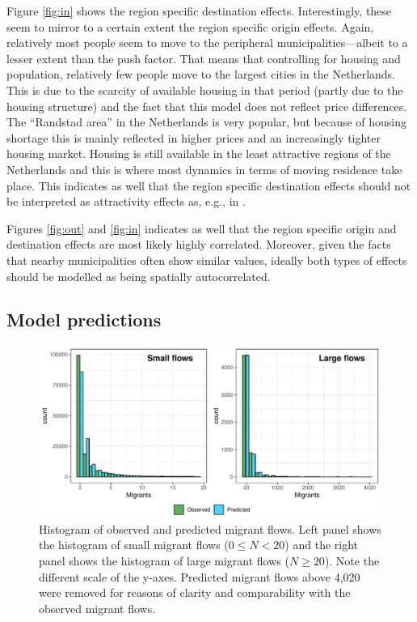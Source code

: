 \documentclass[fleqn,10pt]{SelfArx} %
\begin{document}
{{Figure \ref{fig:in} shows the region specific destination effects. Interestingly, these seem to mirror to a certain extent the region specific origin effects. Again, relatively most people seem to move to the peripheral municipalities---albeit to a lesser extent than the push factor. That means that controlling for housing and population, relatively few people move to the largest cities in the Netherlands. This is due to the scarcity of available housing in that period (partly due to the housing structure) and the fact that this model does not reflect price differences. The ``Randstad area'' in the Netherlands is very popular, but because of housing shortage this is mainly reflected in higher prices and an increasingly tighter housing market. Housing is still available in the least attractive regions of the Netherlands and this is where most dynamics in terms of moving residence take place. This indicates as well that the region specific destination effects should not be interpreted as attractivity effects as, e.g., in \citet{congdon2010random}.

Figures \ref{fig:out} and \ref{fig:in} indicates as well that the region specific origin and destination effects are most likely highly correlated. Moreover, given the facts that nearby municipalities often show similar values, ideally both types of effects should be modelled as being spatially autocorrelated. 

\subsection{Model predictions}

\begin{figure}[t!]\centering 
  \includegraphics[width=0.8\linewidth]{../fig/hist_fit.pdf}
  \caption{Histogram of observed and predicted migrant flows. Left
    panel shows the histogram of small migrant flows ($0 \leq N < 20$)
    and the right panel shows the histogram of large migrant flows
    ($N \geq 20$). Note the different scale of the y-axes. Predicted
    migrant flows above 4,020 were removed for reasons of clarity and
    comparability with the observed migrant flows.  }
  \label{fig:hist_fit}
\end{figure}

}}
\end{document}
